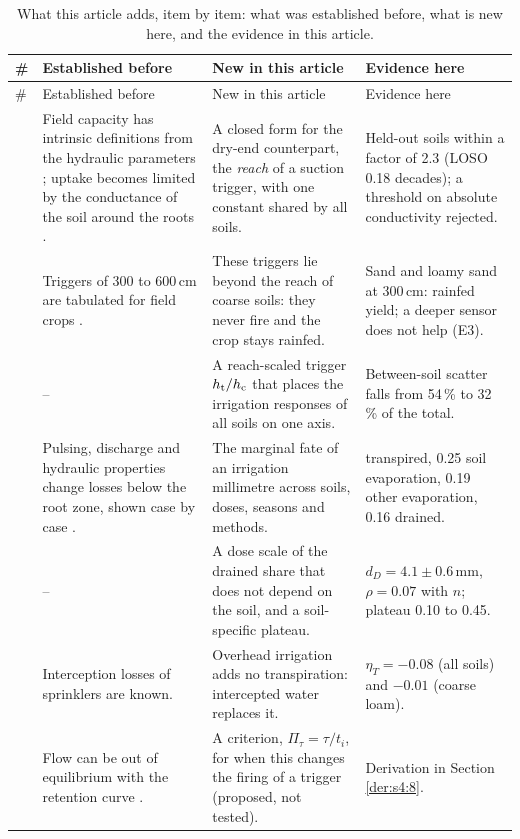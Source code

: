 {\small\setlength{\tabcolsep}{4pt}
\begin{longtable}{@{}>{\raggedright\arraybackslash}p{}>{\raggedright\arraybackslash}p{}>{\raggedright\arraybackslash}p{}>{\raggedright\arraybackslash}p{}@{}}
\caption{What this article adds, item by item: what was established before, what is new here, and the evidence in this article.}\label{tab:novelty}\\
\toprule
\# & Established before & New in this article & Evidence here\\\midrule\endfirsthead
\toprule \# & Established before & New in this article & Evidence here\\\midrule\endhead
1 & Field capacity has intrinsic definitions from the hydraulic parameters \citep{Twarakavi2009,Assouline2014}; uptake becomes limited by the conductance of the soil around the roots \citep{Gardner1960,Carminati2020}. & A closed form for the dry-end counterpart, the \emph{reach} of a suction trigger, with one constant shared by all soils. & Held-out soils within a factor of 2.3 (LOSO 0.18 decades); a threshold on absolute conductivity rejected.\\
2 & Triggers of 300 to 600\,cm are tabulated for field crops \citep{Allen1998}. & These triggers lie beyond the reach of coarse soils: they never fire and the crop stays rainfed. & Sand and loamy sand at 300\,cm: rainfed yield; a deeper sensor does not help (E3).\\
3 & -- & A reach-scaled trigger $h_{\mathrm{t}}/h_{\mathrm{c}}$ that places the irrigation responses of all soils on one axis. & Between-soil scatter falls from 54\,\% to 32\,\% of the total.\\
4 & Pulsing, discharge and hydraulic properties change losses below the root zone, shown case by case \citep{Elmaloglou2007,Elmaloglou2008,Elmaloglou2009b}. & The marginal fate of an irrigation millimetre across soils, doses, seasons and methods. & 0.38 transpired, 0.25 soil evaporation, 0.19 other evaporation, 0.16 drained.\\
5 & -- & A dose scale of the drained share that does not depend on the soil, and a soil-specific plateau. & $d_D=4.1\pm0.6$\,mm, $\rho=0.07$ with $n$; plateau 0.10 to 0.45.\\
6 & Interception losses of sprinklers are known. & Overhead irrigation adds no transpiration: intercepted water replaces it. & $\eta_T=-0.08$ (all soils) and $-0.01$ (coarse loam).\\
7 & Flow can be out of equilibrium with the retention curve \citep{RossSmettem2000,Diamantopoulos2012VZJ}. & A criterion, $\Pi_\tau=\tau/t_i$, for when this changes the firing of a trigger (proposed, not tested). & Derivation in Section \ref{der:s4:8}.\\
\bottomrule
\end{longtable}}
